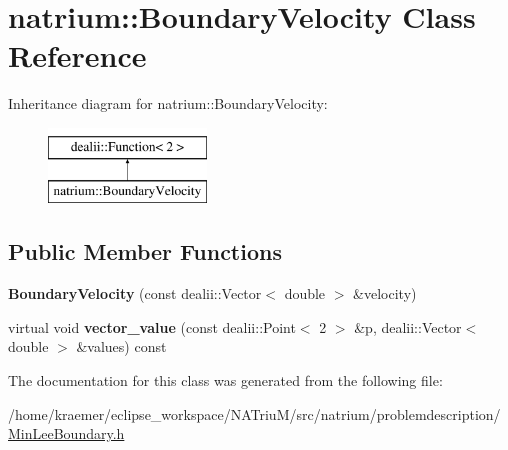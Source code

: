 \hypertarget{classnatrium_1_1BoundaryVelocity}{\section{natrium\-:\-:Boundary\-Velocity Class Reference}
\label{classnatrium_1_1BoundaryVelocity}
}
Inheritance diagram for natrium\-:\-:Boundary\-Velocity\-:\begin{figure}[H]
\begin{center}
\leavevmode
\includegraphics[height=2.000000cm]{classnatrium_1_1BoundaryVelocity}
\end{center}
\end{figure}
\subsection*{Public Member Functions}
\begin{DoxyCompactItemize}
\item 
\hypertarget{classnatrium_1_1BoundaryVelocity_a2deefe9da743338b45f2382ecc50f942}{{\bfseries Boundary\-Velocity} (const dealii\-::\-Vector$<$ double $>$ \&velocity)}\label{classnatrium_1_1BoundaryVelocity_a2deefe9da743338b45f2382ecc50f942}

\item 
\hypertarget{classnatrium_1_1BoundaryVelocity_a468a9411f08b9a6c6f484e096f7d57a1}{virtual void {\bfseries vector\-\_\-value} (const dealii\-::\-Point$<$ 2 $>$ \&p, dealii\-::\-Vector$<$ double $>$ \&values) const }\label{classnatrium_1_1BoundaryVelocity_a468a9411f08b9a6c6f484e096f7d57a1}

\end{DoxyCompactItemize}


The documentation for this class was generated from the following file\-:\begin{DoxyCompactItemize}
\item 
/home/kraemer/eclipse\-\_\-workspace/\-N\-A\-Triu\-M/src/natrium/problemdescription/\hyperlink{MinLeeBoundary_8h}{Min\-Lee\-Boundary.\-h}\end{DoxyCompactItemize}
